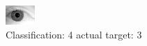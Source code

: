 \begin{figure}[h!]
\begin{center}
\includegraphics[width=0.60\columnwidth]{figures/ID2096_class_4_target_3.png}
\end{center}
\caption{ Classification: 4 actual target: 3}
\label{fig:ID2096_class_4_target_3}
\end{figure}
